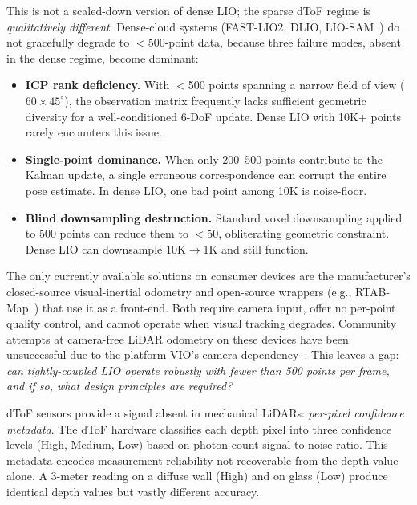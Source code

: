 \documentclass[journal]{IEEEtran}
\begin{document}
This is not a scaled-down version of dense LIO; the sparse dToF regime is \emph{qualitatively different}. Dense-cloud systems (FAST-LIO2, DLIO, LIO-SAM~\cite{shan2020liosam}) do not gracefully degrade to $<$500-point data, because three failure modes, absent in the dense regime, become dominant:
\begin{itemize}
    \item[\textbf{F1.}] \textbf{ICP rank deficiency.} With $<$500 points spanning a narrow field of view ($60\times45^{\circ}$), the observation matrix frequently lacks sufficient geometric diversity for a well-conditioned 6-DoF update. Dense LIO with 10K+ points rarely encounters this issue.
    \item[\textbf{F2.}] \textbf{Single-point dominance.} When only 200--500 points contribute to the Kalman update, a single erroneous correspondence can corrupt the entire pose estimate. In dense LIO, one bad point among 10K is noise-floor.
    \item[\textbf{F3.}] \textbf{Blind downsampling destruction.} Standard voxel downsampling applied to 500 points can reduce them to $<$50, obliterating geometric constraint. Dense LIO can downsample 10K$\rightarrow$1K and still function.
\end{itemize}
The only currently available solutions on consumer devices are the manufacturer's closed-source visual-inertial odometry and open-source wrappers (e.g., RTAB-Map~\cite{labbe2019rtabmap}) that use it as a front-end. Both require camera input, offer no per-point quality control, and cannot operate when visual tracking degrades. Community attempts at camera-free LiDAR odometry on these devices have been unsuccessful due to the platform VIO's camera dependency~\cite{rtabmap_issue1026}. This leaves a gap: \emph{can tightly-coupled LIO operate robustly with fewer than 500 points per frame, and if so, what design principles are required?}

dToF sensors provide a signal absent in mechanical LiDARs: \emph{per-pixel confidence metadata}. The dToF hardware classifies each depth pixel into three confidence levels (High, Medium, Low) based on photon-count signal-to-noise ratio. This metadata encodes measurement reliability not recoverable from the depth value alone. A 3-meter reading on a diffuse wall (High) and on glass (Low) produce identical depth values but vastly different accuracy.
\end{document}
